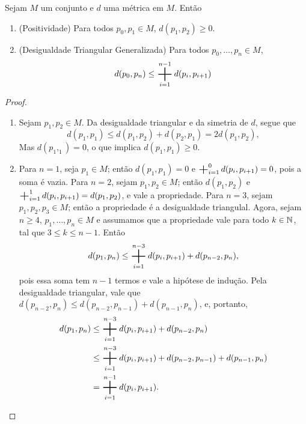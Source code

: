 \begin{prop}
Sejam $M$ um conjunto e $d$ uma métrica em $M$. Então
	\begin{enumerate}
	\item (Positividade) Para todos $p_0,p_1 \in M$, $d(p_1,p_2) \geq 0$.
	\item (Desigualdade Triangular Generalizada) Para todos $p_0,\ldots,p_n \in M$,
		\begin{equation*}
		d(p_0,p_n) \leq \bigplus_{i=1}^{n-1} d(p_i,p_{i+1})
		\end{equation*}
	\end{enumerate}
\end{prop}
\begin{proof}
	\begin{enumerate}
	\item Sejam $p_1,p_2 \in M$. Da desigualdade triangular e da simetria de $d$, segue que
	\begin{equation*}
	d(p_1,p_1) \leq d (p_1,p_2)+d(p_2,p_1)= 2 d(p_1,p_2),
	\end{equation*}
Mas $d(p_1,_1) = 0$, o que implica $d(p_1,p_1) \geq 0$.
	\item Para $n=1$, seja $p_1 \in M$; então $d(p_1,p_1)=0$ e $\bigplus_{i=1}^{0} d(p_i,p_{i+1})=0$, pois a soma é vazia. Para $n=2$, sejam $p_1,p_2 \in M$; então $d(p_1,p_2)$ e $\bigplus_{i=1}^{1} d(p_i,p_{i+1})=d(p_1,p_2)$, e vale a propriedade. Para $n=3$, sejam $p_1,p_2,p_3 \in M$; então a propriedade é a desigualdade triangulal. Agora, sejam $n \geq 4$, $p_1,\ldots,p_n \in M$ e assumamos que a propriedade vale para todo $k \in \mathbb{N}$, tal que $3 \leq k \leq n-1$. Então
	\begin{equation*}
	d(p_1,p_n) \leq \bigplus_{i=1}^{n-3} d(p_i,p_{i+1})+d(p_{n-2},p_n),
	\end{equation*}
pois essa soma tem $n-1$ termos e vale a hipótese de indução. Pela desigualdade triangular, vale que $d(p_{n-2},p_n) \leq d(p_{n-2},p_{n-1})+d(p_{n-1},p_n)$, e, portanto,
	\begin{align*}
	d(p_1,p_n) &\leq \bigplus_{i=1}^{n-3} d(p_i,p_{i+1})+d(p_{n-2},p_n) \\
			&\leq \bigplus_{i=1}^{n-3} d(p_i,p_{i+1}) + d(p_{n-2},p_{n-1})+d(p_{n-1},p_n) \\
			&= \bigplus_{i=1}^{n-1} d(p_i,p_{i+1}).
	\end{align*}
	\end{enumerate}
\end{proof}

